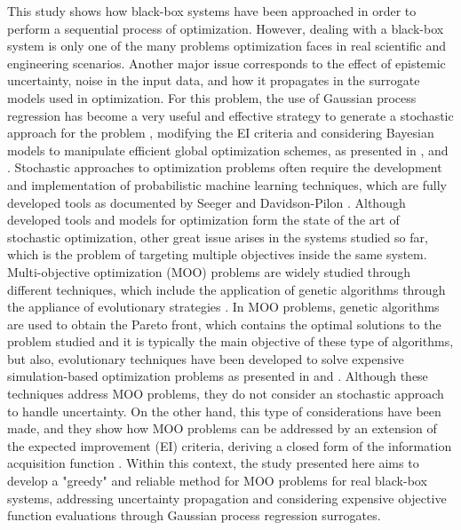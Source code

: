 \documentclass{article}
\begin{document}
This study shows how black-box systems have been approached in order to perform a sequential process of optimization. However, dealing with a black-box system is only one of the many problems optimization faces in real scientific and engineering scenarios. Another major issue corresponds to the effect of epistemic uncertainty, noise in the input data, and how it propagates in the surrogate models used in optimization. For this problem, the use of Gaussian process regression has become a very useful and effective strategy to generate a stochastic approach for the problem \cite{Wang2016}, modifying the EI criteria and considering Bayesian models to manipulate efficient global optimization schemes, as presented in \cite{Huang2006}, \cite{Pandita2016} and \cite{Li2014}. Stochastic approaches to optimization problems often require the development and implementation of probabilistic machine learning techniques, which are fully developed tools as documented by Seeger \cite{Seeger2004} and Davidson-Pilon \cite{Davidson-Pilon2014}. Although developed tools and models for optimization form the state of the art of stochastic optimization, other great issue arises in the systems studied so far, which is the problem of targeting multiple objectives inside the same system.\\

Multi-objective optimization (MOO) problems are widely studied through different techniques, which include the application of genetic algorithms through the appliance of evolutionary strategies \cite{Costa2006}. In MOO problems, genetic algorithms are used to obtain the Pareto front, which contains the optimal solutions to the problem studied and it is typically the main objective of these type of algorithms, but also, evolutionary techniques have been developed to solve expensive simulation-based optimization problems as presented in \cite{Guo2007} and \cite{Huang2009}. Although these techniques address MOO problems, they do not consider an stochastic approach to handle uncertainty. On the other hand, this type of considerations have been made, and they show how MOO problems can be addressed by an extension of the expected improvement (EI) criteria, deriving a closed form of the information acquisition function \cite{wagner2010expected}. Within this context, the study presented here aims to develop a "greedy" and reliable method for MOO problems for real black-box systems, addressing uncertainty propagation and considering expensive objective function evaluations through Gaussian process regression surrogates.\\
\end{document}
